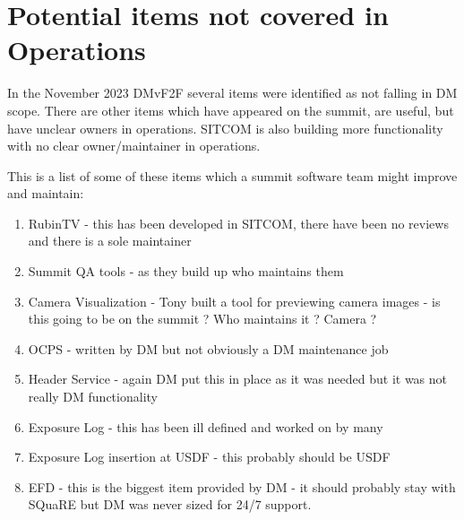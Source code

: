 \section{Potential items not covered in \gls{Operations}} \label{sec:items}

In the November 2023 DMvF2F several items were identified as not falling in \gls{DM} scope.
There are other items which have appeared on the summit, are useful, but have unclear owners in operations.
SITCOM is also building more functionality with no clear owner/maintainer in operations.

This is a list of some of these items which a summit \gls{software} team might improve and maintain:

\begin{enumerate}
\item RubinTV - this has been developed in \gls{SITCOM}, there have been no reviews and there is a sole maintainer
\item Summit \gls{QA} tools - as they build up who maintains them
\item \gls{Camera} Visualization - Tony built a tool for previewing camera images - is this going to be on the summit ? Who maintains it ? \gls{Camera} ?
\item \gls{OCPS} - written by \gls{DM} but not obviously a \gls{DM} maintenance job
\item Header Service - again \gls{DM} put this in place as it was  needed but it was not really \gls{DM} functionality
\item Exposure Log - this has been ill defined and worked on by many
\item Exposure Log  insertion at \gls{USDF} - this probably  should be \gls{USDF}
\item \gls{EFD} - this is the biggest item provided by \gls{DM} - it should probably stay with SQuaRE but \gls{DM} was never sized for 24/7 support.
\end{enumerate}

